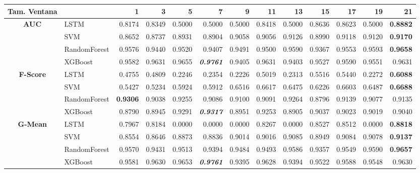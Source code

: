 \begin{table}[H]
	\centering
	\begin{adjustbox}{max width=12cm}
		\begin{tabular}{|c|l|r|r|r|r|r|r|r|r|r|r|r|}
			\hline
			\textbf{Tam. Ventana}&         &      1  &      3  &      5  &      7  &      9  &      11 &      13 &      15 &      17 &      19 &      21 \\
			\hline
			\textbf{AUC} &  LSTM &  0.8174 &  0.8349 &  0.5000 &  0.5000 &  0.5000 &  0.8418 &  0.5000 &  0.8636 &  0.8623 &  0.5000 & \textbf{  0.8882 } \\
			&  SVM &  0.8652 &  0.8737 &  0.8931 &  0.8904 &  0.9058 &  0.9056 &  0.9126 &  0.8990 &  0.9118 &  0.9120 & \textbf{  0.9170 } \\
			&  RandomForest &  0.9576 &  0.9440 &  0.9520 &  0.9407 &  0.9491 &  0.9500 &  0.9590 &  0.9367 &  0.9553 &  0.9593 & \textbf{  0.9658 } \\
			&  XGBoost &  0.9582 &  0.9631 &  0.9655 & \textit{ \textbf{  0.9761 } } &  0.9405 &  0.9631 &  0.9403 &  0.9527 &  0.9590 &  0.9551 &  0.9631 \\
			\hline
			\textbf{F-Score} &  LSTM &  0.4755 &  0.4809 &  0.2246 &  0.2354 &  0.2226 &  0.5019 &  0.2313 &  0.5516 &  0.5440 &  0.2272 & \textbf{  0.6088 } \\
			&  SVM &  0.5427 &  0.5234 &  0.5924 &  0.5912 &  0.6516 &  0.6617 &  0.6475 &  0.6226 &  0.6603 &  0.6487 & \textbf{  0.6688 } \\
			&  RandomForest & \textbf{  0.9306 } &  0.9038 &  0.9255 &  0.9086 &  0.9100 &  0.9091 &  0.9264 &  0.8796 &  0.9139 &  0.9077 &  0.9135 \\
			&  XGBoost &  0.8790 &  0.8945 &  0.9291 & \textit{ \textbf{  0.9317 } } &  0.8951 &  0.9253 &  0.8905 &  0.9037 &  0.9023 &  0.9019 &  0.9040 \\
			\hline
			\textbf{G-Mean} &  LSTM &  0.7967 &  0.8184 &  0.0000 &  0.0000 &  0.0000 &  0.8267 &  0.0000 &  0.8527 &  0.8512 &  0.0000 & \textbf{  0.8818 } \\
			&  SVM &  0.8554 &  0.8646 &  0.8873 &  0.8836 &  0.9014 &  0.9016 &  0.9085 &  0.8949 &  0.9084 &  0.9078 & \textbf{  0.9137 } \\
			&  RandomForest &  0.9570 &  0.9431 &  0.9513 &  0.9394 &  0.9484 &  0.9493 &  0.9586 &  0.9357 &  0.9549 &  0.9590 & \textbf{  0.9657 } \\
			&  XGBoost &  0.9581 &  0.9630 &  0.9653 & \textit{ \textbf{  0.9761 } } &  0.9395 &  0.9628 &  0.9394 &  0.9522 &  0.9588 &  0.9548 &  0.9630 \\

\end{tabular}
\end{adjustbox}
\end{table}
